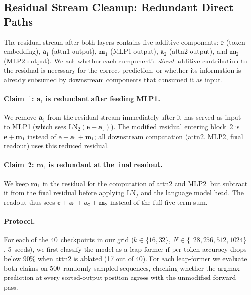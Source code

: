 \subsection{Residual Stream Cleanup: Redundant Direct Paths}
\label{sec:residual-cleanup}

The residual stream after both layers contains five additive components:
$\mathbf{e}$ (token embedding), $\mathbf{a}_1$ (attn1 output),
$\mathbf{m}_1$ (MLP1 output), $\mathbf{a}_2$ (attn2 output), and
$\mathbf{m}_2$ (MLP2 output). We ask whether each component's \emph{direct}
additive contribution to the residual is necessary for the correct prediction,
or whether its information is already subsumed by downstream components that
consumed it as input.

\paragraph{Claim~1: $\mathbf{a}_1$ is redundant after feeding MLP1.}
We remove $\mathbf{a}_1$ from the residual stream immediately after it has
served as input to MLP1 (which sees
$\mathrm{LN}_2(\mathbf{e} + \mathbf{a}_1)$). The modified residual entering
block~2 is $\mathbf{e} + \mathbf{m}_1$ instead of
$\mathbf{e} + \mathbf{a}_1 + \mathbf{m}_1$; all downstream computation
(attn2, MLP2, final readout) uses this reduced residual.

\paragraph{Claim~2: $\mathbf{m}_1$ is redundant at the final readout.}
We keep $\mathbf{m}_1$ in the residual for the computation of attn2 and MLP2,
but subtract it from the final residual before applying $\mathrm{LN}_f$ and the
language model head. The readout thus sees
$\mathbf{e} + \mathbf{a}_1 + \mathbf{a}_2 + \mathbf{m}_2$ instead of the full
five-term sum.

\paragraph{Protocol.}
For each of the 40~checkpoints in our grid
($k \in \{16,32\}$, $N \in \{128,256,512,1024\}$, 5~seeds), we first classify
the model as a leap-former if per-token accuracy drops below 90\% when attn2 is
ablated (17 out of 40). For each leap-former we evaluate both claims on
500~randomly sampled sequences, checking whether the argmax prediction at every
sorted-output position agrees with the unmodified forward pass.

